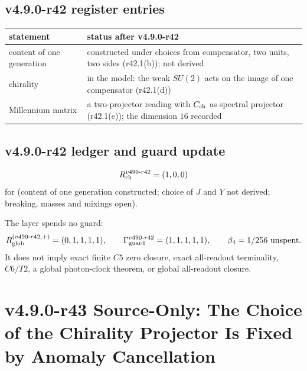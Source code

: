 \subsection*{v4.9.0-r42 register entries}
\label{subsec:v490-r42-register}

\begin{center}
\small
\begin{tabular}{@{}>{\raggedright\arraybackslash}p{}>{\raggedright\arraybackslash}p{}@{}}
\toprule
statement & status after v4.9.0-r42\\
\midrule
content of one generation & constructed under choices from compensator, two units, two sides (r42.1(b)); not derived\\
chirality & in the model: the weak \(SU(2)\) acts on the image of one compensator (r42.1(d))\\
Millennium matrix & a two-projector reading with \(C_{\rm ch}\) as spectral projector (r42.1(e)); the dimension \(16\) recorded\\
\bottomrule
\end{tabular}
\end{center}

\subsection*{v4.9.0-r42 ledger and guard update}
\label{subsec:v490-r42-ledger-guard}

\[
R_{\rm ch}^{v490\text{-}r42}=(1,0,0)
\]
for (content of one generation constructed; choice of \(J\) and \(Y\) not derived; breaking, masses and mixings open).

The layer spends no guard:
\[
R_{\rm glob}^{(v490\text{-}r42,+)}=(0,1,1,1,1),
\qquad
\Gamma_{\rm guard}^{v490\text{-}r42}=(1,1,1,1,1),
\qquad
\beta_4=1/256\ \text{unspent}.
\]
It does not imply exact finite \(C5\) zero closure, exact all-readout terminality,
\(C6/T2\), a global photon-clock theorem, or global all-readout closure.
\clearpage
\section*{v4.9.0-r43 Source-Only: The Choice of the Chirality Projector Is Fixed by Anomaly Cancellation}
\label{sec:v490-r43-choice-anomalies}

